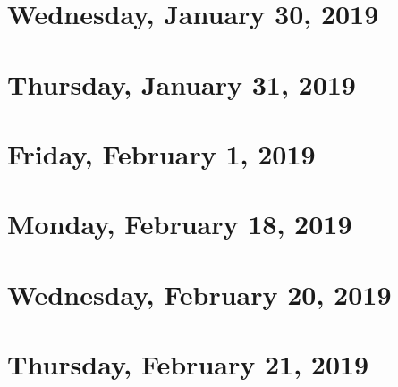 \documentclass[reqno]{amsart}
\begin{document}
\section{Wednesday, January 30, 2019}
    

\section{Thursday, January 31, 2019}
    

\section{Friday, February 1, 2019}
    

\section{Monday, February 18, 2019}
    

\section{Wednesday, February 20, 2019}
    

\section{Thursday, February 21, 2019}
    
\end{document}
